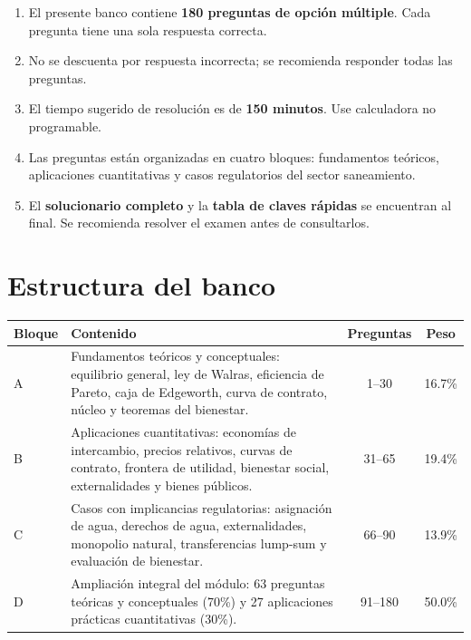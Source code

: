 \documentclass[11pt,a4paper]{article}
\begin{document}
\begin{enumerate}[label=\arabic*.,leftmargin=1.6em,itemsep=3pt]
  \item El presente banco contiene \textbf{180 preguntas de opción múltiple}. Cada pregunta tiene una sola respuesta correcta.
  \item No se descuenta por respuesta incorrecta; se recomienda responder todas las preguntas.
  \item El tiempo sugerido de resolución es de \textbf{150 minutos}. Use calculadora no programable.
  \item Las preguntas están organizadas en cuatro bloques: fundamentos teóricos, aplicaciones cuantitativas y casos regulatorios del sector saneamiento.
  \item El \textbf{solucionario completo} y la \textbf{tabla de claves rápidas} se encuentran al final. Se recomienda resolver el examen antes de consultarlos.
\end{enumerate}

\section*{Estructura del banco}

\begin{center}
\renewcommand{\arraystretch}{1.25}
\begin{tabular}{@{}p{1.4cm}>{\raggedright\arraybackslash}p{7.6cm}cc@{}}
\toprule
\textbf{Bloque} & \textbf{Contenido} & \textbf{Preguntas} & \textbf{Peso} \\
\midrule
A & Fundamentos teóricos y conceptuales: equilibrio general, ley de Walras, eficiencia de Pareto, caja de Edgeworth, curva de contrato, núcleo y teoremas del bienestar. & 1--30 & 16.7\% \\
B & Aplicaciones cuantitativas: economías de intercambio, precios relativos, curvas de contrato, frontera de utilidad, bienestar social, externalidades y bienes públicos. & 31--65 & 19.4\% \\
C & Casos con implicancias regulatorias: asignación de agua, derechos de agua, externalidades, monopolio natural, transferencias lump-sum y evaluación de bienestar. & 66--90 & 13.9\% \\
D & Ampliación integral del módulo: 63 preguntas teóricas y conceptuales (70\%) y 27 aplicaciones prácticas cuantitativas (30\%). & 91--180 & 50.0\% \\
\bottomrule
\end{tabular}
\end{center}
\end{document}
